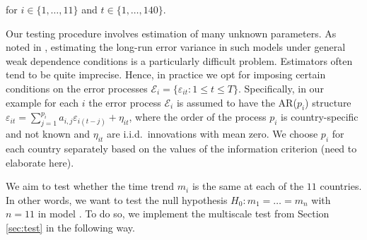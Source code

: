 \documentclass[a4paper,12pt]{article}
\makeatletter
\renewcommand{\eqref}[1]{\tagform@{\ref{#1}}}
\makeatother
\begin{document}
{for $i \in \{1, \ldots, 11\}$ and $t \in \{1, \ldots, 140\}$.

Our testing procedure involves estimation of many unknown parameters. As noted in \cite{KhismatullinaVogt2020}, estimating the long-run error variance in such models under general weak dependence conditions is a particularly difficult problem. Estimators often tend to be quite imprecise. Hence, in practice we opt for imposing certain conditions on the error processes $\mathcal{E}_i = \{ \varepsilon_{it}: 1 \le t \le T \}$. Specifically, in our example for each $i$ the error process $\mathcal{E}_i$ is assumed to have the AR($p_i$) structure $\varepsilon_{it} = \sum_{j=1}^{p_i} a_{i, j} \varepsilon_{i(t-j)} + \eta_{it}$, where the order of the process $p_i$ is country-specific and not known and $\eta_{it}$ are i.i.d.\ innovations with mean zero. We choose $p_i$ for each country separately based on the values of the information criterion (need to elaborate here).

We aim to test whether the time trend $m_i$ is the same at each of the $11$ countries. In other words, we want to test the null hypothesis $H_0: m_1 = \ldots = m_n$ with $n = 11$ in model \eqref{eq:model:app2}. To do so, we implement the multiscale test from Section \ref{sec:test} in the following way. 

}
\end{document}
